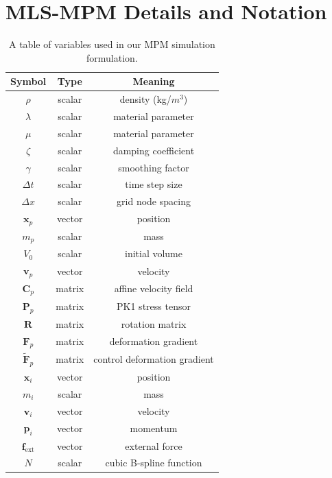 \cleardoublepage
{}
\appendix
\chapter{MLS-MPM Details and Notation}  %
\label{app:mlsmpm}

\begin{table}[ht!]
    \caption{\textmd{A table of variables used in our {MPM} simulation formulation.}}
    \centering
    \begin{tabular}{ccc}
    \toprule
        Symbol & Type & Meaning \\ 
    \midrule
    $\rho$ & scalar & density (kg/$m^3$)  \\ 
    $\lambda$ & scalar & material parameter \\
    $\mu$ & scalar & material parameter \\
    $\zeta$ & scalar & damping coefficient\\ 
    $\gamma$ & scalar & smoothing factor\\
    $\Delta t$ & scalar & time step size  \\
    $\Delta x$ & scalar & grid node spacing \\
    \midrule	
    $\mathbf{x}_{p}$ & vector & position \\
    $m_{p}$ & scalar & mass \\
    $V_{0}$ & scalar & initial volume \\
    $\mathbf{v}_{p}$ & vector & velocity \\
    \midrule	
    $\mathbf{C}_{p}$ & matrix & affine velocity field \\
    $\mathbf{P}_{p}$ & matrix & PK1 stress tensor \\
    $\mathbf{R}$ & matrix & rotation matrix  \\
    $\mathbf{F}_{p}$ & matrix & deformation gradient  \\
    $\mathbf{\tilde{F}}_{p}$ & matrix & control deformation gradient \\
    \midrule	
    $\mathbf{x}_{i}$ & vector & position \\
    $m_{i}$ & scalar & mass  \\
    $\mathbf{v}_{i}$ & vector & velocity \\
    $\mathbf{p}_{i}$ & vector & momentum \\
    $\mathbf{f}_{\text{ext}}$ & vector & external force  \\
    $N$ & scalar & cubic B-spline function \\
    \bottomrule
    \end{tabular}
    \vspace{1mm}
    \label{tab:mpm-syms}
    \\
\end{table}

